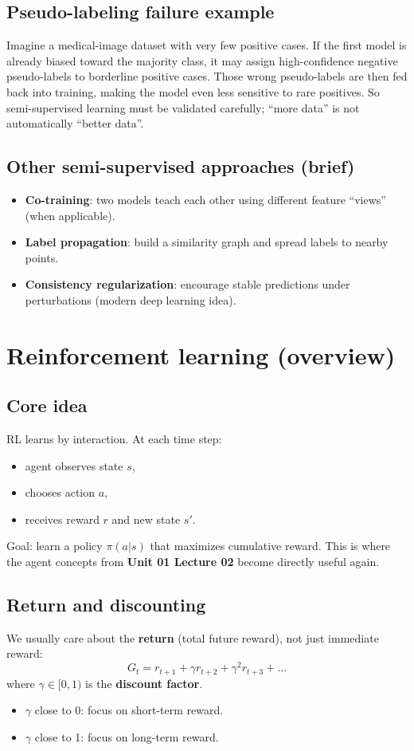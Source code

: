 \documentclass[11pt]{article}
\begin{document}
\subsection{Pseudo-labeling failure example}
Imagine a medical-image dataset with very few positive cases.
If the first model is already biased toward the majority class, it may assign high-confidence negative pseudo-labels to borderline positive cases.
Those wrong pseudo-labels are then fed back into training, making the model even less sensitive to rare positives.
So semi-supervised learning must be validated carefully; ``more data'' is not automatically ``better data''.

\subsection{Other semi-supervised approaches (brief)}
\begin{itemize}[leftmargin=*]
  \item \textbf{Co-training}: two models teach each other using different feature ``views'' (when applicable).
  \item \textbf{Label propagation}: build a similarity graph and spread labels to nearby points.
  \item \textbf{Consistency regularization}: encourage stable predictions under perturbations (modern deep learning idea).
\end{itemize}

\section{Reinforcement learning (overview)}
\subsection{Core idea}
RL learns by interaction. At each time step:
\begin{itemize}[leftmargin=*]
  \item agent observes state $s$,
  \item chooses action $a$,
  \item receives reward $r$ and new state $s'$.
\end{itemize}
Goal: learn a policy $\pi(a|s)$ that maximizes cumulative reward.
This is where the agent concepts from \textbf{Unit 01 Lecture 02} become directly useful again.

\subsection{Return and discounting}
We usually care about the \textbf{return} (total future reward), not just immediate reward:
\[
  G_t = r_{t+1} + \gamma r_{t+2} + \gamma^2 r_{t+3} + \dots
\]
where $\gamma \in [0,1)$ is the \textbf{discount factor}.
\begin{itemize}[leftmargin=*]
  \item $\gamma$ close to 0: focus on short-term reward.
  \item $\gamma$ close to 1: focus on long-term reward.
\end{itemize}
\end{document}
